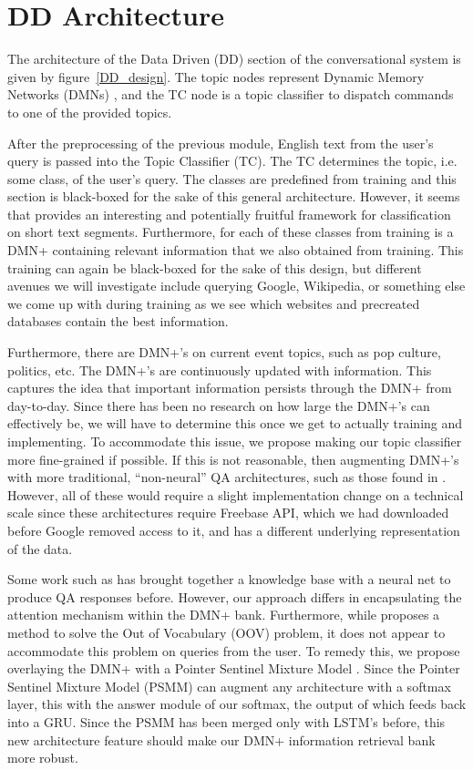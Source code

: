 \documentclass[10pt,twoside,twocolumn]{article}
\begin{document}
\section{DD Architecture}
The architecture of the Data Driven (DD) section of the conversational system is given by figure~\ref{DD_design}. The topic nodes represent Dynamic Memory Networks (DMNs) \cite{Kumar:2015, Xiong2016}, and the TC node is a topic classifier to dispatch commands to one of the provided topics.

\noindent
After the preprocessing of the previous module, English text from the user's query is passed into the Topic Classifier (TC). The TC determines the topic, i.e. some class, of the user's query. The classes are predefined from training and this section is black-boxed for the sake of this general architecture. However, it seems that \cite{Zhao2011} provides an interesting and potentially fruitful framework for classification on short text segments. Furthermore, for each of these classes from training is a DMN+ \cite{Xiong2016} containing relevant information that we also obtained from training. This training can again be black-boxed for the sake of this design, but different avenues we will investigate include querying Google, Wikipedia, or something else we come up with during training as we see which websites and precreated databases contain the best information.

\noindent
Furthermore, there are DMN+'s on current event topics, such as pop culture, politics, etc. The DMN+'s are continuously updated with information. This captures the idea that important information persists through the DMN+ from day-to-day. Since there has been no research on how large the DMN+'s can effectively be, we will have to determine this once we get to actually training and implementing. To accommodate this issue, we propose making our topic classifier more fine-grained if possible. If this is not reasonable, then augmenting DMN+'s with more traditional, ``non-neural'' QA architectures, such as those found in \cite{Iyyer2014, Yao2014a, Yao2014b}. However, all of these would require a slight implementation change on a technical scale since these architectures require Freebase API, which we had downloaded before Google removed access to it, and has a different underlying representation of the data.

\noindent
Some work such as \cite{Zhang2016} has brought together a knowledge base with a neural net to produce QA responses before. However, our approach differs in encapsulating the attention mechanism within the DMN+ bank. Furthermore, while \cite{Zhang2016} proposes a method to solve the Out of Vocabulary (OOV) problem, it does not appear to accommodate this problem on queries from the user. To remedy this, we propose overlaying the DMN+ \cite{Xiong2016} with a Pointer Sentinel Mixture Model \cite{Merity2016}. Since the Pointer Sentinel Mixture Model (PSMM) can augment any architecture with a softmax layer, this with the answer module of our softmax, the output of which feeds back into a GRU. Since the PSMM has been merged only with LSTM's before, this new architecture feature should make our DMN+ information retrieval bank more robust.
\end{document}
